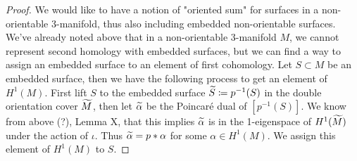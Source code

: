 \begin{proof}
We would like to have a notion of "oriented sum" for surfaces in a non-orientable 3-manifold, thus also including embedded non-orientable surfaces. We've already noted above that in a non-orientable 3-manifold $M$, we cannot represent second homology with embedded surfaces, but we can find a way to assign an embedded surface to an element of first cohomology. Let $S \subset M$ be an embedded surface, then we have the following process to get an element of $H^1(M)$. First lift $S$ to the embedded surface $\widetilde{S} \coloneqq p^{-1}(S)$ in the double orientation cover $\widetilde{M}$, then let $\widetilde{\alpha}$ be the Poincar\'e dual of $[p^{-1}(S)]$. We know from above (?), Lemma X, that this implies $\widetilde{\alpha}$ is in the 1-eigenspace of $H^1(\widetilde{M})$ under the action of $\iota$. Thus $\widetilde{\alpha} = p*\alpha$ for some $\alpha \in H^1(M)$. We assign this element of $H^1(M)$ to $S$. 

\end{proof}